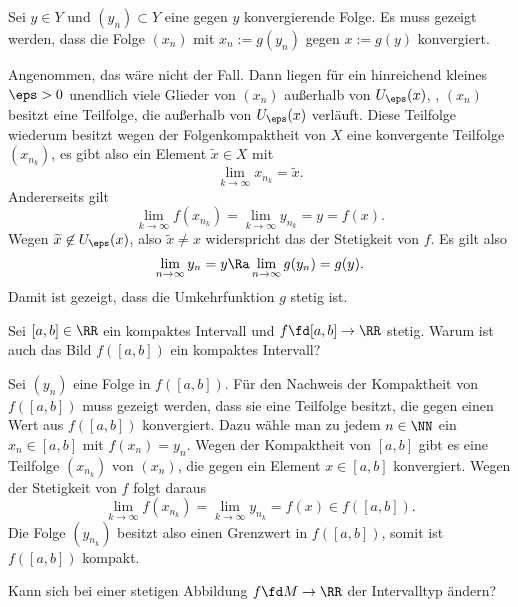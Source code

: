 \begin{antwort}
  Sei $y\in Y$ und $(y_n)\subset Y$ eine gegen $y$ konvergierende Folge. 
  Es muss gezeigt werden, dass die Folge $(x_n)$ mit $x_n:=g(y_n)$ gegen 
  $x:=g(y)$ konvergiert. 

  Angenommen, das wäre nicht der Fall. Dann liegen für ein hinreichend 
  kleines $\eps>0$ unendlich viele Glieder 
  von $(x_n)$ außerhalb von $U_\eps( x )$, {\dasheisst}, $(x_n)$ besitzt 
  eine Teilfolge, die außerhalb von $U_\eps(x)$ verläuft. Diese Teilfolge 
  wiederum besitzt wegen der Folgenkompaktheit von $X$ eine konvergente 
  Teilfolge $(x_{n_k})$, es gibt also ein Element $\widetilde{x}\in X$ mit
  \[
  \lim_{k\to\infty} x_{n_k} = \widetilde{x}.
  \]
  Andererseits gilt
  \[
  \lim_{k\to\infty} f(x_{n_k}) = \lim_{k\to\infty} y_{n_k} = y = f(x). 
  \]
  Wegen $\widetilde{x}\not\in U_\eps(x)$, also 
  $\widetilde{x}\not=x$ widerspricht das der Stetigkeit von $f$. Es gilt also 
  \[
  \lim\limits_{n\to\infty} y_n = y
  \Ra \lim_{n\to\infty} g(y_n)= g(y).
  \]
  Damit ist  gezeigt, dass die Umkehrfunktion $g$ stetig ist.   
  \AntEnd   
\end{antwort}

\begin{frage}\label{03_kbld}
  Sei $[a,b]\in\RR$ ein kompaktes Intervall und 
  $f\fd [a,b]\to\RR$ stetig. Warum ist auch das Bild 
  $f([a,b])$ ein kompaktes Intervall?  
\end{frage}

\begin{antwort}
  Sei $(y_n)$ eine Folge in $f([a,b])$. Für den Nachweis 
  der Kompaktheit von $f([a,b])$ muss gezeigt werden, dass sie eine 
  Teilfolge besitzt, die gegen einen Wert aus $f([a,b])$ 
  konvergiert. Dazu wähle man zu jedem $n\in\NN$ 
  ein $x_n\in [a,b]$ mit $f(x_n)=y_n$. Wegen der Kompaktheit 
  von $[a,b]$ gibt es eine Teilfolge $(x_{n_k})$ von $(x_n)$, 
  die gegen ein Element $x \in [a,b]$ konvergiert. 
  Wegen der Stetigkeit von $f$ folgt daraus 
  \[
  \lim_{k\to\infty} f(x_{n_k})= \lim_{k\to\infty} y_{n_k}=f(x) \in f([a,b]).
  \]
  Die Folge $(y_{n_k})$ besitzt also einen 
  Grenzwert in $f([a,b])$, somit ist $f([a,b])$ kompakt. 
  \AntEnd 
\end{antwort}

\begin{frage} \label{03_ityp}
  Kann sich bei einer stetigen Abbildung $f\fd M\to\RR$ der Intervalltyp 
  ändern?
\end{frage}

